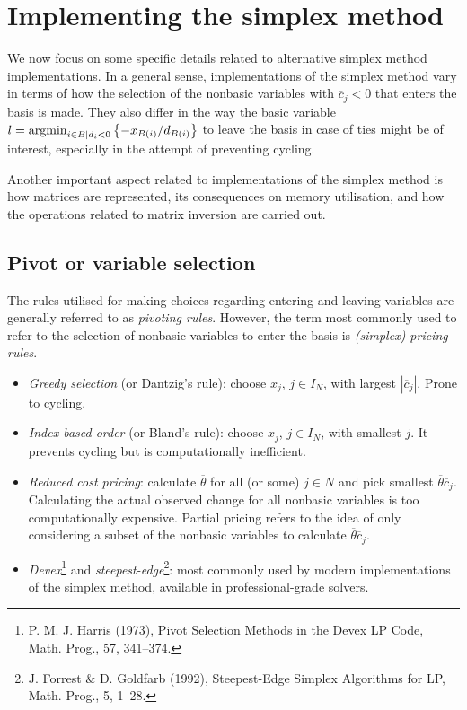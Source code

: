 \section{Implementing the simplex method}

We now focus on some specific details related to alternative simplex method implementations. In a general sense, implementations of the simplex method vary in terms of how the selection of the nonbasic variables with $\overline{c}_j < 0$ that enters the basis is made. They also differ in the way the basic variable $l = \mathop{\rm argmin}_{i \in B \mid d_i <0}\left\{ -x_{B(i)}/d_{B(i)} \right \}$ to leave the basis in case of ties might be of interest, especially in the attempt of preventing cycling.

Another important aspect related to implementations of the simplex method is how matrices are represented, its consequences on memory utilisation, and how the operations related to matrix inversion are carried out. 


\subsection{Pivot or variable selection}

The rules utilised for making choices regarding entering and leaving variables are generally referred to as \emph{pivoting rules}. However, the term most commonly used to refer to the selection of nonbasic variables to enter the basis is \emph{(simplex) pricing rules}.

\begin{itemize}
	\item \emph{Greedy selection} (or Dantzig's rule): choose $x_j$, $j \in I_N$, with largest $|\overline{c}_j|$. Prone to cycling.
	\item \emph{Index-based order} (or Bland's rule): choose $x_j$,  $j \in I_N$, with smallest $j$. It prevents cycling but is computationally inefficient. 
	\item \emph{Reduced cost pricing}: calculate $\overline{\theta}$ for all (or some) $j \in N$ and pick smallest $\overline{\theta}\overline{c}_j$. Calculating the actual observed change for all nonbasic variables is too computationally expensive. Partial pricing refers to the idea of only considering a subset of the nonbasic variables to calculate $\overline{\theta}\overline{c}_j$.
	\item \emph{Devex}\footnote{P. M. J. Harris (1973), Pivot Selection Methods in the Devex LP Code, Math. Prog., 57, 341--374.} and \emph{steepest-edge}\footnote{J. Forrest \& D. Goldfarb (1992), Steepest-Edge Simplex Algorithms for LP, Math. Prog., 5, 1--28.}: most commonly used by modern implementations of the simplex method, available in professional-grade solvers. 
\end{itemize}


